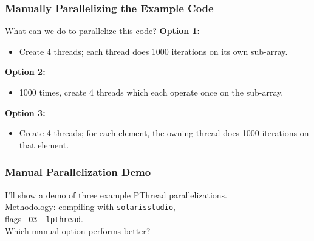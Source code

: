 \begin{frame}
  \frametitle{Manually Parallelizing the Example Code}


  What can we do to parallelize this code?
  \vfill
  {\bf Option 1:} 

  \begin{itemize}
    \item<2-> Create 4 threads; each thread does 1000 iterations on its own sub-array.
  \end{itemize}

  {\bf Option 2:} 

  \begin{itemize}
    \item<3-> 1000 times, create 4 threads which each operate once on the sub-array.
  \end{itemize}

  {\bf Option 3:} 
  \begin{itemize}
    \item<4-> Create 4 threads; for each element, the owning thread does 1000 iterations on that element.
  \end{itemize}

\end{frame}

\begin{frame}
  \frametitle{Manual Parallelization Demo}


  I'll show a demo of three example PThread parallelizations.\\[1em]

  Methodology: compiling with {\tt solarisstudio}, \\ flags {\tt -O3 -lpthread}.\\[1em]

  Which manual option performs better?


\end{frame}


